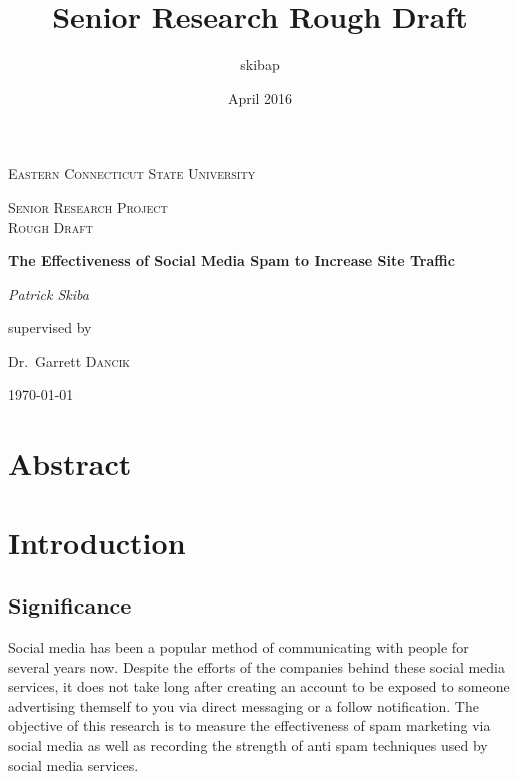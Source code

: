 \documentclass{article}
\title{Senior Research Rough Draft}
\author{skibap }
\date{April 2016}
\begin{document}
\begin{titlepage}
	\centering
	{\scshape\LARGE Eastern Connecticut State University \par}
	\vspace{1cm}
	{\scshape\Large Senior Research Project \\ Rough Draft\par}
	\vspace{1.5cm}
	{\huge\bfseries The Effectiveness of Social Media Spam to Increase Site Traffic\par}
	\vspace{2cm}
	{\Large\itshape Patrick Skiba\par}
	\vfill
	supervised by\par
	Dr.~Garrett \textsc{Dancik}

	\vfill

	{\large \today\par}
\end{titlepage}

\section{Abstract}
\section{Introduction}
\subsection{Significance} Social media has been a popular method of communicating with people for several years now. Despite the efforts of the companies behind these social media services, it does not take long after creating an account to be exposed to someone advertising themself to you via direct messaging or a follow notification. The objective of this research is to measure the effectiveness of spam marketing via social media as well as recording the strength of anti spam techniques used by social media services.
\end{document}
